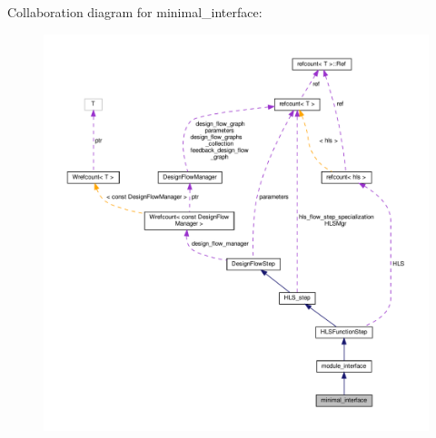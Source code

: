 Collaboration diagram for minimal\+\_\+interface\+:
\nopagebreak
\begin{figure}[H]
\begin{center}
\leavevmode
\includegraphics[width=350pt]{d0/d74/classminimal__interface__coll__graph}
\end{center}
\end{figure}
